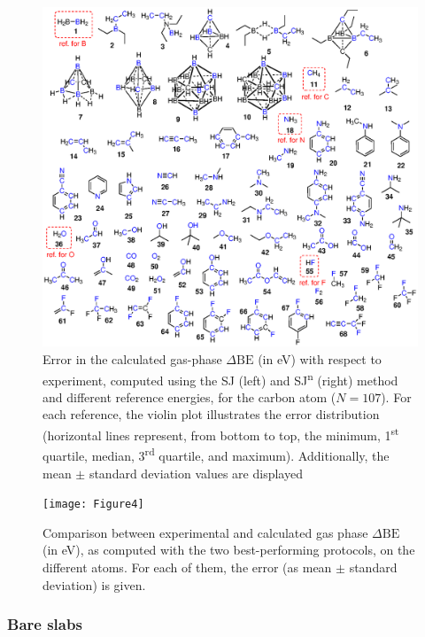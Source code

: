 \documentclass[%
aip,
amsmath,amssymb,
preprint,%
jcp,
showkeys,
]{revtex4-2}
\def\dbe{\ensuremath{\Delta\text{BE}}}
\begin{document}
\begin{figure}
	\centering
	\includegraphics[width=\linewidth]{Figure3}
	\caption{Error in the calculated gas-phase \dbe{}  (in \si{\electronvolt}) with respect to experiment, computed using the SJ (left) and SJ\textsuperscript{n} (right) method and different reference energies, for the carbon atom ($N=107$). For each reference, the violin plot illustrates the error distribution (horizontal lines represent, from bottom to top, the minimum, 1\textsuperscript{st} quartile, median, 3\textsuperscript{rd} quartile, and maximum). Additionally, the mean $\pm$ standard deviation values are displayed}
	\label{fig:xps_C185_C}
\end{figure}


\begin{figure}[p]
	\centering
	\texttt{[image: Figure4]}
	\caption{Comparison between experimental and calculated gas phase \dbe{} (in \si{\electronvolt}), as computed with the two best-performing protocols, on the different atoms. For each of them, the error (as mean $\pm$ standard deviation) is given.}
	\label{fig:xps_C185}
\end{figure}

\clearpage

\subsubsection{Bare slabs}
\end{document}

